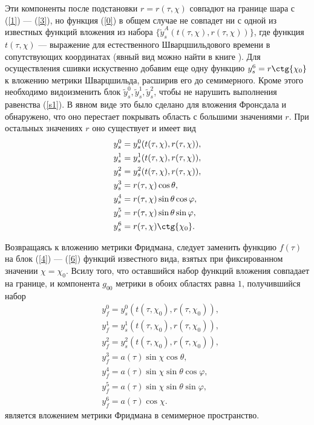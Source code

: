 \documentclass[12pt]{article}
\begin{document}
Эти компоненты после подстановки $r = r(\tau, \chi)$ совпадют на границе шара с (\ref{1}) --- (\ref{3}), но функция (\ref{0}) в общем случае не совпадет ни с одной из известных функций вложения из набора $\{\tilde y_s^A(t(\tau, \chi),r(\tau, \chi))\}$, где функция $t(\tau, \chi)$ --- выражение для естественного Шварцшильдового времени в сопутствующих координатах (явный вид можно найти в книге \cite{misner}). Для осуществления сшивки искуственно добавим еще одну функцию $y_s^6 = r \ctg{\chi_0}$ к вложению метрики Шварцшильда, расширив его до семимерного. Кроме этого необходимо видоизменить блок $\tilde y^0_s,\tilde y^1_s,\tilde y^2_s$, чтобы не нарушить выполнения равенства (\ref{s1}). В явном виде это было сделано для вложения Фронсдала и обнаружено, что оно перестает покрывать область с большими значениями $r$. При остальных значениях $r$ оно существует и имеет вид
\begin{align}
\label{4}	&y^0_s = y^0_s(t(\tau, \chi), r(\tau, \chi)), \\
\label{5}	&y^1_s = y^1_s(t(\tau, \chi), r(\tau, \chi)), \\
\label{6}	&y^2_s = y^2_s(t(\tau, \chi), r(\tau, \chi)), \\
	&y^3_s = r(\tau, \chi) \cos{\theta}, \\
	&y^4_s = r(\tau, \chi) \sin{\theta} \cos{\varphi}, \\
	&y^5_s = r(\tau, \chi) \sin{\theta} \sin{\varphi}, \\
\label{7}	&y^6_s = r(\tau, \chi) \ctg{\chi_0}.
\end{align}

Возвращаясь к вложению метрики Фридмана, следует заменить функцию $f(\tau)$ на блок (\ref{4}) --- (\ref{6}) функций известного вида, взятых при фиксированном значении $\chi = \chi_0$. Всилу того, что оставшийся набор функций вложения совпадает на границе, и компонента $g_{00}$ метрики в обоих областях равна $1$, получившийся набор
\begin{align}
	&y^0_f = y^0_s(t(\tau, \chi_0), r(\tau, \chi_0)), \\
	&y^1_f = y^1_s(t(\tau, \chi_0), r(\tau, \chi_0)), \\
	&y^2_f = y^2_s(t(\tau, \chi_0), r(\tau, \chi_0)), \\
	&y^3_f = a(\tau) \sin{\chi} \cos{\theta}, \\
	&y^4_f = a(\tau) \sin{\chi} \sin{\theta} \cos{\varphi}, \\
	&y^5_f = a(\tau) \sin{\chi} \sin{\theta} \sin{\varphi}, \\
	&y^6_f = a(\tau) \cos{\chi}.
\end{align}
является вложением метрики Фридмана в семимерное пространство.
\end{document}

